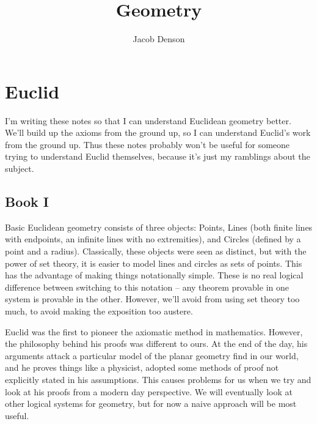 

\title{Geometry}
\author{Jacob Denson}



\maketitle
\tableofcontents
{}

\part{Euclid}

I'm writing these notes so that I can understand Euclidean geometry better. We'll build up the axioms from the ground up, so I can understand Euclid's work from the ground up. Thus these notes probably won't be useful for someone trying to understand Euclid themselves, because it's just my ramblings about the subject.

\chapter{Book I}

Basic Euclidean geometry consists of three objects: Points, Lines (both finite lines with endpoints, an infinite lines with no extremities), and Circles (defined by a point and a radius). Classically, these objects were seen as distinct, but with the power of set theory, it is easier to model lines and circles as sets of points. This has the advantage of making things notationally simple. These is no real logical difference between switching to this notation -- any theorem provable in one system is provable in the other. However, we'll avoid from using set theory too much, to avoid making the exposition too austere.

Euclid was the first to pioneer the axiomatic method in mathematics. However, the philosophy behind his proofs was different to ours. At the end of the day, his arguments attack a particular model of the planar geometry find in our world, and he proves things like a physicist, adopted some methods of proof not explicitly stated in his assumptions. This causes problems for us when we try and look at his proofs from a modern day perspective. We will eventually look at other logical systems for geometry, but for now a naive approach will be most useful.

